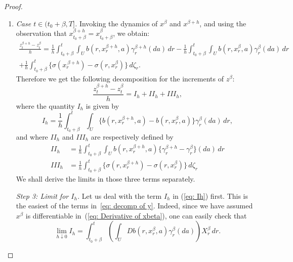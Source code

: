 \documentclass[12pt,reqno]{amsart}
\numberwithin{equation}{section}  %
\newcommand{\1}{{\bf 1}}
\newcommand{\2}{{\bf 2}}
\newcommand{\ga}{\gamma}
\newcommand{\lp}{\left(}
\newcommand{\rp}{\right)}
\theoremstyle{remark}
\theoremstyle{remark}
\begin{document}
\begin{proof}
\begin{enumerate}[wide, labelwidth=!, labelindent=0pt, label=\emph{(\roman*)}]
    \item \emph{Case $t\in (t_{0}+\beta,T]$.}
   Invoking the dynamics of $x^{\beta}$ and $x^{\beta+h}$, and using the observation that $x^{\beta+h}_{t_{0}+\beta}=x^{\beta}_{t_{0}+\beta}$, we obtain:
   \begin{multline*}
       \frac{z_{t}^{\beta+h}-z^{\beta}_{t}}{h}
       =\frac{1}{h}\int_{t_{0}+\beta}^{t}\int_{U}b(r,x_{r}^{\beta+h},a)\ga_{r}^{\beta+h}(da)\,dr 
       -\frac{1}{h}\int_{t_{0}+\beta}^{t}\int_Ub(r,x_{r}^{\beta},a)\ga_{r}^{\beta}(da)\,dr\\
       +\frac{1}{h}\int_{t_{0}+\beta}^{t}\{\sigma(x_{r}^{\
       \beta+h})-\sigma(r,x_{r}^{\beta})\}\,d\zeta_{r}.
\end{multline*}
Therefore we get the following decomposition for the increments of $z^{\beta}$:
\begin{equation}
    \frac{z^{\beta+h}_{t}-z^{\beta}_{t}}{h}=I_{h}+II_{h}+III_{h},
\label{eq: decomp of y}
\end{equation}
where the quantity $I_{h}$ is given by
\begin{equation}\label{eq: Ih}
 I_{h} 
 =\frac{1}{h}\int_{t_{0}+\beta}^{t}\int_{U}\{b(r,x_{r}^{\beta+h},a)-b(r,x_{r}^{\beta},a)\}\ga_{r}^{\beta}(da)\,dr ,
\end{equation}
and where $II_{h}$ and $III_{h}$ are respectively defined by
\begin{align}
  \label{eq: IIh} II_{h}&=\frac{1}{h}\int_{t_{0}+\beta}^{t}\int_{U}b(r,x_{r}^{\beta+h},a)\{\ga^{\beta+h}_{r}-\ga^{\beta}_{r}\}(da)\, dr\\
     \label{eq: IIIh}  III_{h}&=\frac{1}{h} \int_{t_{0}+\beta}^{t}\{\sigma(r,x_{r}^{\beta+h})-\sigma(r,x_{r}^{\beta})\}\,d\zeta_{r}
\end{align}
We shall derive the limits in those three terms separately.


\smallskip
\noindent
\textit{Step 3: Limit for $I_{h}$.} 
Let us deal with the term $I_{h}$ in (\ref{eq: Ih}) first. This is the easiest of the terms in~\eqref{eq: decomp of y}. Indeed, since we have assumed $x^{\beta}$ is differentiable in~(\ref{eq: Derivative of xbeta}), one can easily check that
\begin{equation}
\lim_{h\downarrow0}I_{h}=\int_{t_{0}+\beta}^{t}\lp\int_{U}Db(r,x_{r}^{\beta},a)\ga_{r}^{\beta}(da) \rp X_{r}^{\beta}\,dr.
\label{eq: limit Ih}\end{equation}



\end{enumerate}
\end{proof}
\end{document}
